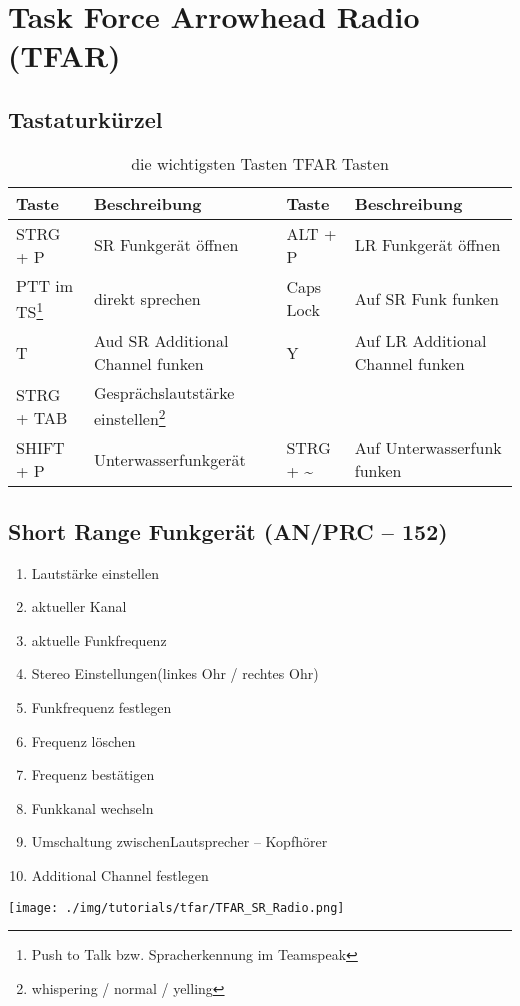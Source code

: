 \section{Task Force Arrowhead Radio (TFAR)}
\label{TFAR}
\subsection{Tastaturkürzel}
\begin{longtable}{|p{2cm}|p{5 cm}||p{2cm}|p{4cm}|} 
	\caption[Trupp]{die wichtigsten Tasten TFAR Tasten} \\ 
	\hline
	\cellcolor{backcolor} \textbf{Taste} & \textbf{Beschreibung} & \cellcolor{backcolor}\textbf{Taste} & \textbf{Beschreibung}  \\ 
	\hline
	\cellcolor{backcolor} STRG + P & SR Funkgerät öffnen & \cellcolor{backcolor}  ALT + P &  LR Funkgerät öffnen \\
	\hline
	\cellcolor{backcolor} PTT im TS\footnote{Push to Talk bzw. Spracherkennung im Teamspeak} & direkt sprechen & \cellcolor{backcolor}  Caps Lock & Auf SR Funk funken \\
	 \hline
	\cellcolor{backcolor} T & Aud SR Additional Channel funken & \cellcolor{backcolor}  Y & Auf LR Additional Channel funken \\
	 \hline
	\cellcolor{backcolor} STRG + TAB & Gesprächslautstärke einstellen\footnote{whispering / normal / yelling} & \cellcolor{backcolor}  & \\
	 \hline
	\cellcolor{backcolor} SHIFT + P & Unterwasserfunkgerät & \cellcolor{backcolor}  STRG + \~ & Auf Unterwasserfunk funken \\
	 \hline
\end{longtable}
\subsection{Short Range Funkgerät (AN/PRC – 152)}
	\begin{minipage} [b]{0.5\textwidth}
		\begin{enumerate}
			\item Lautstärke einstellen
			\item aktueller Kanal
			\item aktuelle Funkfrequenz
			\item Stereo Einstellungen\nl (linkes Ohr / rechtes Ohr)
			\item Funkfrequenz festlegen
			\item Frequenz löschen
			\item Frequenz bestätigen
			\item Funkkanal wechseln
			\item Umschaltung zwischen\nl Lautsprecher -- Kopfhörer
			\item Additional Channel festlegen
		\end{enumerate}
	\end{minipage}
	\begin{minipage}[t]{0.4\textwidth}
		\texttt{[image: ./img/tutorials/tfar/TFAR\_SR\_Radio.png]}
	\end{minipage}


